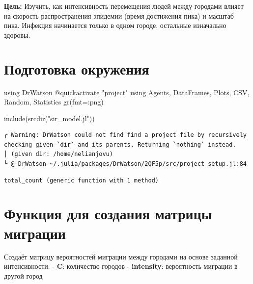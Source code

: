 \documentclass[
  12pt,
  a4paper,
  DIV=11,
  numbers=noendperiod]{scrreprt}
\newenvironment{Shaded}{\begin{snugshade}}{\end{snugshade}}
\newcommand{\BuiltInTok}[1]{\textcolor[rgb]{0.00,0.23,0.31}{#1}}
\newcommand{\FunctionTok}[1]{\textcolor[rgb]{0.28,0.35,0.67}{#1}}
\newcommand{\ImportTok}[1]{\textcolor[rgb]{0.00,0.46,0.62}{#1}}
\newcommand{\NormalTok}[1]{\textcolor[rgb]{0.00,0.23,0.31}{#1}}
\newcommand{\OperatorTok}[1]{\textcolor[rgb]{0.37,0.37,0.37}{#1}}
\newcommand{\PreprocessorTok}[1]{\textcolor[rgb]{0.68,0.00,0.00}{#1}}
\newcommand{\StringTok}[1]{\textcolor[rgb]{0.13,0.47,0.30}{#1}}
\begin{document}
\textbf{Цель:} Изучить, как интенсивность перемещения людей между
городами влияет на скорость распространения эпидемии (время достижения
пика) и масштаб пика. Инфекция начинается только в одном городе,
остальные изначально здоровы.

\section{Подготовка
окружения}\label{ux43fux43eux434ux433ux43eux442ux43eux432ux43aux430-ux43eux43aux440ux443ux436ux435ux43dux438ux44f}

\begin{Shaded}
\begin{Highlighting}[]
\ImportTok{using} \BuiltInTok{DrWatson}
\PreprocessorTok{@quickactivate} \StringTok{"project"}
\ImportTok{using} \BuiltInTok{Agents}\NormalTok{, }\BuiltInTok{DataFrames}\NormalTok{, }\BuiltInTok{Plots}\NormalTok{, }\BuiltInTok{CSV}\NormalTok{, }\BuiltInTok{Random}\NormalTok{, }\BuiltInTok{Statistics}
\FunctionTok{gr}\NormalTok{(fmt}\OperatorTok{=:}\NormalTok{png)}

\FunctionTok{include}\NormalTok{(}\FunctionTok{srcdir}\NormalTok{(}\StringTok{"sir\_model.jl"}\NormalTok{))}
\end{Highlighting}
\end{Shaded}

\begin{verbatim}
┌ Warning: DrWatson could not find find a project file by recursively checking given `dir` and its parents. Returning `nothing` instead.
│ (given dir: /home/nelianjovu)
└ @ DrWatson ~/.julia/packages/DrWatson/2QF5p/src/project_setup.jl:84
\end{verbatim}

\begin{verbatim}
total_count (generic function with 1 method)
\end{verbatim}

\section{Функция для создания матрицы
миграции}\label{ux444ux443ux43dux43aux446ux438ux44f-ux434ux43bux44f-ux441ux43eux437ux434ux430ux43dux438ux44f-ux43cux430ux442ux440ux438ux446ux44b-ux43cux438ux433ux440ux430ux446ux438ux438}

Создаёт матрицу вероятностей миграции между городами на основе заданной
интенсивности. - \textbf{C}: количество городов - \textbf{intensity}:
вероятность миграции в другой город
\end{document}
